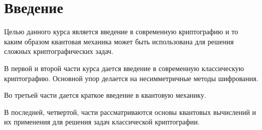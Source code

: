 \chapter*{Введение}
Целью данного курса является введение в современную криптографию и то
каким образом квантовая механика может быть использована для решения
сложных криптографических задач.

В первой и второй части курса дается введение в современную классическую
криптографию. Основной упор делается на несимметричные методы
шифрования.

Во третьей части дается краткое введение в квантовую механику.

В последней, четвертой, части рассматриваются основы квантовых вычислений и их
применения для решения задач классической криптографии.
